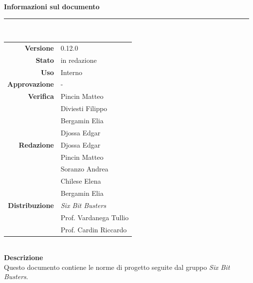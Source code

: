 \begin{titlepage}
\begin{center}
	\large \textbf{Informazioni sul documento} \\
	\rule{0.6\textwidth}{0.4pt}
	\\[0.5cm]
	\begin{tabular}{r|l}
		\textbf{Versione} & 0.12.0\\
		\textbf{Stato} & in redazione\\
		\textbf{Uso} & Interno\\                         
		\textbf{Approvazione} & -\\                      
		\textbf{Verifica} & Pincin Matteo\\ & Diviesti Filippo\\ & Bergamin Elia\\ & Djossa Edgar\\                        
		\textbf{Redazione} & Djossa Edgar \\ & Pincin Matteo \\ & Soranzo Andrea\\ & Chilese Elena \\ & Bergamin Elia\\
		\textbf{Distribuzione} & \textit{Six Bit Busters} \\ & Prof. Vardanega Tullio \\ & Prof. Cardin Riccardo
	\end{tabular}	
	\\[0.8cm]

	\large \textbf{Descrizione} \\
	Questo documento contiene le norme di progetto seguite dal gruppo \textit{Six Bit Busters}.
	
	
	
	\end{center}
\end{titlepage}
